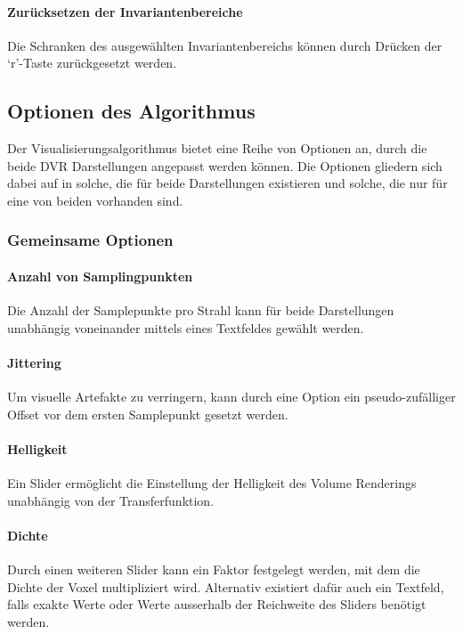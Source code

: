\documentclass[a4paper,fontsize=12pt,toc=bib,halfparskip]{scrartcl}
\begin{document}
\paragraph{Zur\"ucksetzen der Invariantenbereiche}
Die Schranken des ausgew\"ahlten Invariantenbereichs k\"onnen durch Dr\"ucken der `r'-Taste zur\"uckgesetzt werden.

\subsection{Optionen des Algorithmus}

Der Visualisierungsalgorithmus bietet eine Reihe von Optionen an, durch die beide DVR Darstellungen angepasst werden k\"onnen. Die Optionen gliedern sich dabei auf in solche, die f\"ur beide Darstellungen existieren und solche, die nur f\"ur eine von beiden vorhanden sind. 

\subsubsection{Gemeinsame Optionen}

\paragraph{Anzahl von Samplingpunkten}
Die Anzahl der Samplepunkte pro Strahl kann f\"ur beide Darstellungen unabh\"angig voneinander mittels eines Textfeldes gew\"ahlt werden.

\paragraph{Jittering}
Um visuelle Artefakte zu verringern, kann durch eine Option ein pseudo-zuf\"alliger Offset vor dem ersten Samplepunkt gesetzt werden.

\paragraph{Helligkeit}
Ein Slider erm\"oglicht die Einstellung der Helligkeit des Volume Renderings unabh\"angig von der Transferfunktion.

\paragraph{Dichte}
Durch einen weiteren Slider kann ein Faktor festgelegt werden, mit dem die Dichte der Voxel multipliziert wird. Alternativ existiert daf\"ur auch ein Textfeld, falls exakte Werte oder Werte ausserhalb der Reichweite des Sliders ben\"otigt werden.
\end{document}
